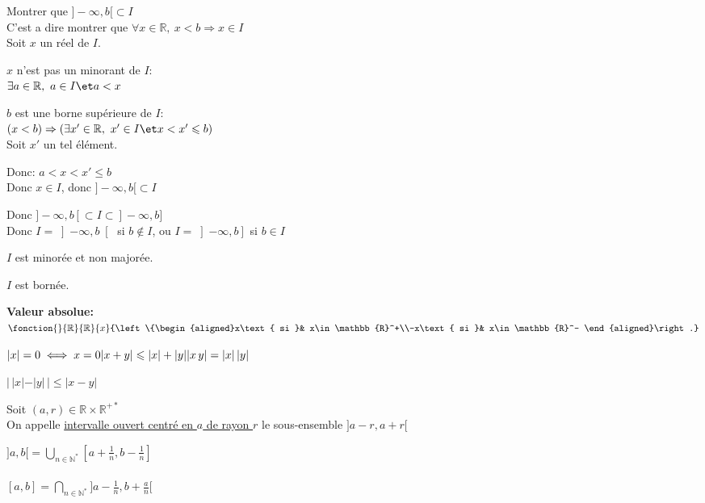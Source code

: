 \documentclass[12pt,twoside,a4paper]{article}
\begin{document}
\begin{preuve}
\begin{tab}
\begin{liste}
\begin{liste}
\begin{liste}
										\item Montrer que $]-\infty,b[\subset I$\\
											C'est a dire montrer que $\forall x\in\mathbb{R},\ x<b\Rightarrow x\in I$\\
											Soit $x$ un réel de $I$.
											\begin{liste}
												\item $x$ n'est pas un minorant de $I$:\\
													$\exists a\in \mathbb{R},\ a\in I\et a<x$
												\item $b$ est une borne supérieure de $I$:\\
													$(x<b)\Rightarrow(\exists x'\in \mathbb{R},\ x'\in I\et x<x'\leqslant b)$\\
													Soit $x'$ un tel élément.
											\end{liste}
											Donc: $a<x<x'\leqslant b$\\
											Donc $x\in I$, donc $]-\infty,b[\subset I$
										\item Donc $]-\infty,b[\subset I \subset ]-\infty,b]$\\
											Donc $I=\left]-\infty,b\right[$ si $b\notin I$, ou $I=\left]-\infty,b\right]$ si $b\in I$
									\end{liste}
								\item[\textbullet] $I$ est minorée et non majorée.
								\item[\textbullet] $I$ est bornée.
							\end{liste}
					\end{liste}
				\end{tab}
			\end{preuve}
			\begin{defi}
				\textbf{Valeur absolue:} $\fonction{}{\mathbb{R}}{\mathbb{R}}{x}{\left\{\begin{aligned}x\text{ si }& x\in\mathbb{R}^+\\-x\text{ si }& x\in\mathbb{R}^- \end{aligned}\right.}$
			\end{defi}
			\begin{prop}
				$|x|=0\iff x=0\\
				|x+y|\leqslant|x|+|y|\\
				|x\,y|=|x|\,|y|$
			\end{prop}
			\begin{coro}
				$|\,|x|-|y|\,|\leqslant|x-y|$
			\end{coro}
			\begin{defi}
				Soit $(a,r)\in\mathbb{R}\times\mathbb{R}^{+*}$\\
				On appelle \underline{intervalle ouvert centré en $a$ de rayon $r$} le sous-ensemble $]a-r,a+r[$
			\end{defi}
			\begin{prop}
				$]a,b[=\bigcup\limits_{n\in\mathbb{N}^*}[a+\frac{1}{n},b-\frac{1}{n}]$\\\\
				$[a,b]=\bigcap\limits_{n\in\mathbb{N}^*}]a-\frac{1}{n},b+\frac{a}{n}[$
			\end{prop}	
\end{document}

